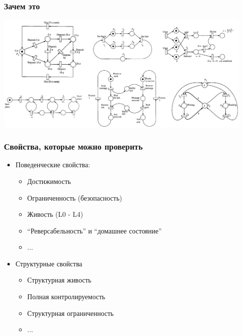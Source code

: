 \documentclass{../../slides-style}
\begin{document}
    \begin{frame}
        \frametitle{Зачем это}
        \begin{center}
            \includegraphics[width=0.95\textwidth]{petriNetExamples.png}
        \end{center}
    \end{frame}

    \begin{frame}
        \frametitle{Свойства, которые можно проверить}
        \begin{itemize}
            \item Поведенческие свойства:
            \begin{itemize}
                \item Достижимость
                \item Ограниченность (безопасность)
                \item Живость (L0 - L4)
                \item ``Реверсабельность'' и ``домашнее состояние''
                \item ...
            \end{itemize}
            \item Структурные свойства
            \begin{itemize}
                \item Структурная живость
                \item Полная контролируемость
                \item Структурная ограниченность
                \item ...
            \end{itemize}
        \end{itemize}
    \end{frame}
\end{document}
